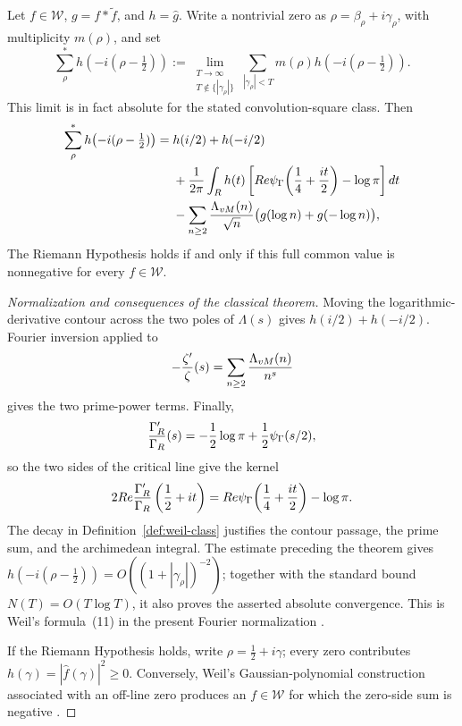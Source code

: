 \begin{theorem}
\label{thm:weil}
Let \(f\in\mathcal W\), \(g=f*\widetilde f\), and
\(h=\widehat g\).  Write a nontrivial zero as
\(\rho=\beta_\rho+i\gamma_\rho\), with multiplicity \(m(\rho)\), and set
\[
 \sum_\rho^{*}h\!\left(-i(\rho-\tfrac12)\right)
 :=\lim_{\substack{T\to\infty\\
                    T\notin\{|\gamma_\rho|\}}}
 \sum_{|\gamma_\rho|<T}m(\rho)
 h\!\left(-i(\rho-\tfrac12)\right).
\]
This limit is in fact absolute for the stated convolution-square class.
Then
\[
\begin{aligned}
 \sum_\rho^{*}h\!\left(-i(\rho-\tfrac12)\right)
 ={}&h(i/2)+h(-i/2)\\
 &+\frac1{2\pi}\int_{R}h(t)
 \left[Re\psi_{\Gamma}\!\left(\frac14+\frac{it}{2}\right)
 -\log\pi\right]dt\\
 &-\sum_{n\geq2}\frac{\Lambda_{vM}(n)}{\sqrt n}
 \bigl(g(\log n)+g(-\log n)\bigr),
\end{aligned}
\]
The Riemann Hypothesis
holds if and only if this full common value is nonnegative for every
\(f\in\mathcal W\).
\end{theorem}

\begin{proof}[Normalization and consequences of the classical theorem]
Moving the logarithmic-derivative contour across the two poles of
\(\Lambda(s)\) gives \(h(i/2)+h(-i/2)\).  Fourier inversion applied to
\[
 -\frac{\zeta'}{\zeta}(s)
 =\sum_{n\geq2}\frac{\Lambda_{vM}(n)}{n^s}
\]
gives the two prime-power terms.  Finally,
\[
 \frac{\Gamma_{R}'}{\Gamma_{R}}(s)
 =-\frac12\log\pi+\frac12\psi_{\Gamma}(s/2),
\]
so the two sides of the critical line give the kernel
\[
 2Re\frac{\Gamma_{R}'}{\Gamma_{R}}
 \left(\frac12+it\right)
 =Re\psi_{\Gamma}\!\left(\frac14+\frac{it}{2}\right)-\log\pi.
\]
The decay in Definition~\ref{def:weil-class} justifies the contour passage,
the prime sum, and the archimedean integral.  The estimate preceding the
theorem gives
\(h(-i(\rho-\tfrac12))=O((1+|\gamma_\rho|)^{-2})\); together with
the standard bound \(N(T)=O(T\log T)\), it also proves the asserted absolute
convergence.  This is Weil's formula~(11)
in the present Fourier normalization
\cite[p.~262, formula~(11)]{Weil1952}.

If the Riemann Hypothesis holds, write
\(\rho=\tfrac12+i\gamma\); every zero contributes
\(h(\gamma)=|\widehat f(\gamma)|^2\geq0\).  Conversely, Weil's
Gaussian-polynomial construction associated with an off-line zero produces
an \(f\in\mathcal W\) for which the zero-side sum is negative
\cite[pp.~262--263, unnumbered lemma immediately following
formula~(11)]{Weil1952}.
\end{proof}

